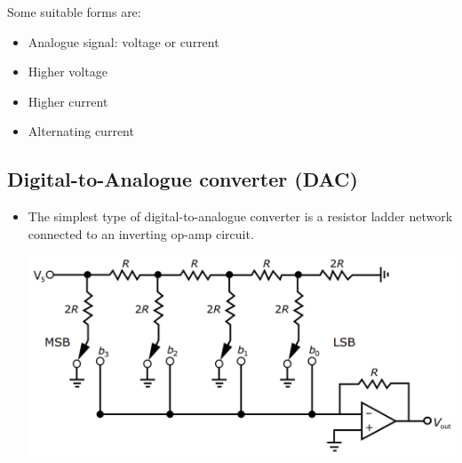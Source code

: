 \documentclass[11pt]{article}
\begin{document}
Some suitable forms are:
\begin{itemize}
\item Analogue signal: voltage or current
\item Higher voltage
\item Higher current
\item Alternating current
\end{itemize}

\subsection{Digital-to-Analogue converter (DAC)}
\label{sec:orgf5c1c6f}
\begin{itemize}
\item The simplest type of digital-to-analogue converter is a resistor ladder network connected to an inverting op-amp circuit.
\begin{center}
\includegraphics[width=.9\linewidth]{./images/digital-to-analogue-converter.png}
\end{center}
\end{itemize}

 \newpage
\end{document}
